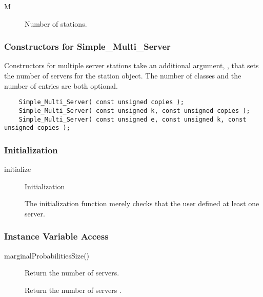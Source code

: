 \begin{description}
\item[M] \texonly{---} Number of stations.
\end{description}

\subsubsection{Constructors for Simple\_Multi\_Server}

Constructors for multiple server stations take an additional argument,
, that sets the number of servers for the station object.
The number of classes  and the number of entries  are
both optional.

\begin{verbatim}
    Simple_Multi_Server( const unsigned copies );
    Simple_Multi_Server( const unsigned k, const unsigned copies );
    Simple_Multi_Server( const unsigned e, const unsigned k, const unsigned copies );
\end{verbatim}

\subsubsection{Initialization}

\begin{description}
\item[initialize] \texonly{---} Initialization\\

  The initialization function merely checks that the user defined at
  least one server.
\end{description}

\subsubsection{Instance Variable Access}

\begin{description}
\item[marginalProbabilitiesSize()] \texonly{---} Return the number of servers.\\

  Return the number of servers .

\end{description}

